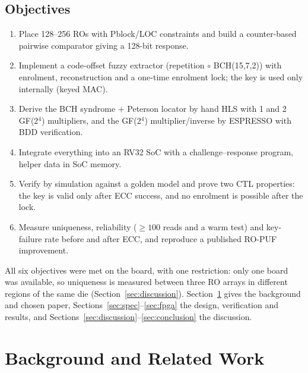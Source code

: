 \documentclass[11pt,a4paper]{article}
\begin{document}
\subsection{Objectives}
\begin{enumerate}
  \item Place 128--256 ROs with Pblock/LOC constraints and build a counter-based pairwise comparator
        giving a 128-bit response.
  \item Implement a code-offset fuzzy extractor (repetition $\circ$ BCH(15,7,2)) with enrolment,
        reconstruction and a one-time enrolment lock; the key is used only internally (keyed MAC).
  \item Derive the BCH syndrome + Peterson locator by hand HLS with 1 and 2 GF(2$^4$) multipliers, and the
        GF(2$^4$) multiplier/inverse by ESPRESSO with BDD verification.
  \item Integrate everything into an RV32 SoC with a challenge--response program, helper data in SoC memory.
  \item Verify by simulation against a golden model and prove two CTL properties: the key is valid only
        after ECC success, and no enrolment is possible after the lock.
  \item Measure uniqueness, reliability (${\ge}100$ reads and a warm test) and key-failure rate before and
        after ECC, and reproduce a published RO-PUF improvement.
\end{enumerate}
All six objectives were met on the board, with one restriction: only one board was available, so
uniqueness is measured between three RO arrays in different regions of the same die
(Section~\ref{sec:discussion}). Section~\ref{sec:related} gives the background and chosen paper,
Sections~\ref{sec:spec}--\ref{sec:fpga} the design, verification and results, and
Sections~\ref{sec:discussion}--\ref{sec:conclusion} the discussion.

\section{Background and Related Work}
\label{sec:related}
\end{document}
